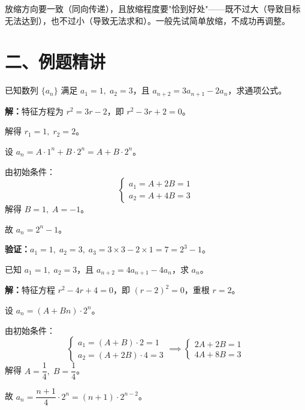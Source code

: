 \documentclass[12pt, a4paper]{ctexart}
\begin{document}
\begin{tipbox}[放缩原则]
放缩方向要一致（同向传递），且放缩程度要"恰到好处"——既不过大（导致目标无法达到），也不过小（导致无法求和）。一般先试简单放缩，不成功再调整。
\end{tipbox}

\section*{\textcolor{examorange}{二、例题精讲}}

\begin{examplebox}[【例题1】特征方程法求通项]
已知数列 $\{a_n\}$ 满足 $a_1 = 1,\;a_2 = 3$，且 $a_{n+2} = 3a_{n+1} - 2a_n$，求通项公式。
\end{examplebox}

\textbf{解：}特征方程为 $r^2 = 3r - 2$，即 $r^2 - 3r + 2 = 0$。

解得 $r_1 = 1,\;r_2 = 2$。

设 $a_n = A \cdot 1^n + B \cdot 2^n = A + B \cdot 2^n$。

由初始条件：
\[
\begin{cases}
a_1 = A + 2B = 1 \\
a_2 = A + 4B = 3
\end{cases}
\]
解得 $B = 1,\;A = -1$。

故 $a_n = 2^n - 1$。

\textbf{验证：}$a_1 = 1,\;a_2 = 3,\;a_3 = 3\times 3 - 2\times 1 = 7 = 2^3 - 1$。\;\checkmark

\begin{examplebox}[【例题2】重根情形的特征方程法]
已知 $a_1 = 1,\;a_2 = 3$，且 $a_{n+2} = 4a_{n+1} - 4a_n$，求 $a_n$。
\end{examplebox}

\textbf{解：}特征方程 $r^2 - 4r + 4 = 0$，即 $(r-2)^2 = 0$，重根 $r = 2$。

设 $a_n = (A + Bn) \cdot 2^n$。

由初始条件：
\[
\begin{cases}
a_1 = (A+B) \cdot 2 = 1 \\
a_2 = (A+2B) \cdot 4 = 3
\end{cases}
\implies
\begin{cases}
2A + 2B = 1 \\
4A + 8B = 3
\end{cases}
\]
解得 $A = \dfrac{1}{4},\;B = \dfrac{1}{4}$。

故 $a_n = \dfrac{n+1}{4} \cdot 2^n = (n+1)\cdot 2^{n-2}$。
\end{document}
